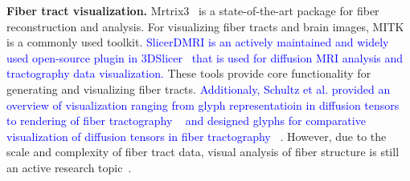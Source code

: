 \noindent\textbf{Fiber tract visualization.}
Mrtrix3~\cite{tournier2012mrtrix} is a state-of-the-art package for fiber reconstruction and analysis.
For visualizing fiber tracts and brain images, MITK~\cite{Fritzsche2012MITKDI} is a commonly used toolkit. \textcolor{blue}{SlicerDMRI is an actively maintained and widely used open-source plugin in 3DSlicer~\cite{Kikinis2014} that is used for diffusion MRI analysis and tractography data visualization.}
These tools provide core functionality for generating and visualizing fiber tracts. \textcolor{blue}{Additionaly, Schultz et al. provided an overview of visualization ranging from glyph representatioin in diffusion tensors to rendering of fiber tractography ~\cite{https://doi.org/10.1002/nbm.3902} and designed glyphs for comparative visualization of diffusion tensors in fiber tractography~\cite{zhang2015glyph} }. However, due to the scale and complexity of fiber tract data, visual analysis of fiber structure 
is still an active research topic~\cite{everts2015exploration}.
